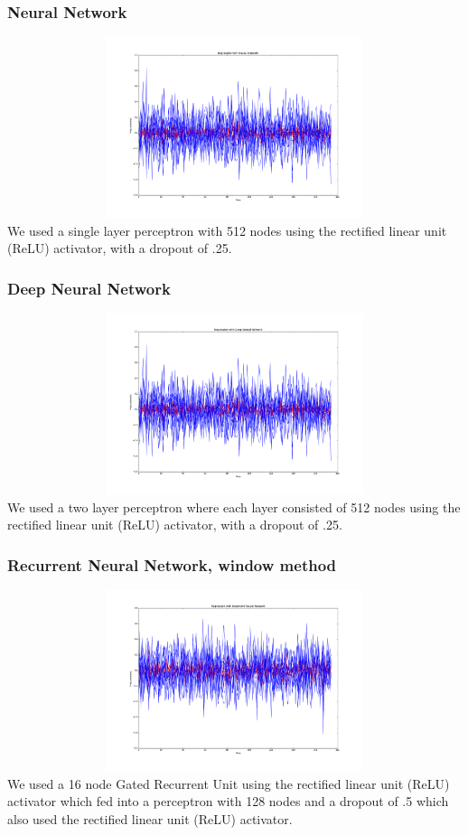 \documentclass[12pt,a4paper]{article}
\begin{document}
\subsubsection{Neural Network}
\includegraphics[height=200px, width=1\textwidth]{nn_regression_projection_a_neq_b}
We used a single layer perceptron with 512 nodes using the rectified linear unit (ReLU) activator, with a dropout of .25.  

\subsubsection{Deep Neural Network}
\includegraphics[height=200px, width=1\textwidth]{deep_nn_regression_projection_a_neq_b}
We used a two layer perceptron where each layer consisted of 512 nodes using the rectified linear unit (ReLU) activator, with a dropout of .25.  

\subsubsection{Recurrent Neural Network, window method}
\includegraphics[height=200px, width=1\textwidth]{window_rnn_regression_projection_a_neq_b}
We used a 16 node Gated Recurrent Unit using the rectified linear unit (ReLU) activator which fed into a perceptron with 128 nodes and a dropout of .5 which also used the rectified linear unit (ReLU) activator.  
\end{document}
